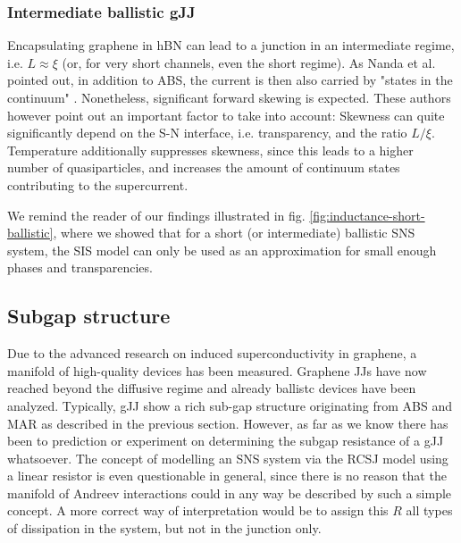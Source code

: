 \subsubsection{Intermediate ballistic gJJ}
Encapsulating graphene in hBN can lead to a junction in an intermediate regime, i.e. $L\approx\xi$ (or, for very short channels, even the short regime).
As Nanda et al. pointed out, in addition to ABS, the current is then also carried by "states in the continuum" \cite{nandaCurrentPhaseRelationBallistic2017}.
Nonetheless, significant forward skewing is expected.
These authors however point out an important factor to take into account:
Skewness can quite significantly depend on the S-N interface, i.e. transparency, and the ratio $L/\xi$.
Temperature additionally suppresses skewness, since this leads to a higher number of quasiparticles, and increases the amount of continuum states contributing to the supercurrent.

We remind the reader of our findings illustrated in fig. \ref{fig:inductance-short-ballistic}, where we showed that for a short (or intermediate) ballistic SNS system, the SIS model can only be used as an approximation for small enough phases and transparencies.

\subsection{Subgap structure}
Due to the advanced research on induced superconductivity in graphene, a manifold of high-quality devices has been measured.
Graphene JJs have now reached beyond the diffusive regime and already ballistc devices have been analyzed.
Typically, gJJ show a rich sub-gap structure originating from ABS and MAR as described in the previous section.
However, as far as we know there has been to prediction or experiment on determining the subgap resistance of a gJJ whatsoever.
The concept of modelling an SNS system via the RCSJ model using a linear resistor is even questionable in general, since there is no reason that the manifold of Andreev interactions could in any way be described by such a simple concept.
A more correct way of interpretation would be to assign this $R$ all types of dissipation in the system, but not in the junction only.

